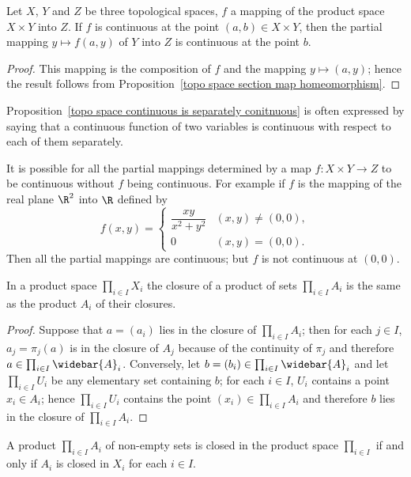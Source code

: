 \begin{proposition}\label{topo space continuous is separately conitnuous}
Let $X$, $Y$ and $Z$ be three topological spaces, $f$ a mapping of the product space $X\times Y$ into $Z$. If $f$ is continuous at the point $(a,b)\in X\times Y$, then the partial mapping $y\mapsto f(a,y)$ of $Y$ into $Z$ is continuous at the point $b$.
\end{proposition}
\begin{proof}
This mapping is the composition of $f$ and the mapping $y\mapsto(a,y)$; hence the result follows from Proposition~\ref{topo space section map homeomorphism}.
\end{proof}
Proposition~\ref{topo space continuous is separately conitnuous} is often expressed by saying that a continuous function of two variables is continuous with respect to each of them separately.
\begin{example}
It is possible for all the partial mappings determined by a map $f:X\times Y\to Z$ to be continuous without $f$ being continuous. For example if $f$ is the mapping of the real plane $\R^2$ into $\R$ defined by
\[f(x,y)=\begin{cases}
\dfrac{xy}{x^2+y^2}&(x,y)\neq(0,0),\\
0&(x,y)=(0,0).
\end{cases}\]
Then all the partial mappings are continuous; but $f$ is not continuous at $(0,0)$.
\end{example}
\begin{proposition}\label{topo space closure of product subspace}
In a product space $\prod_{i\in I}X_i$ the closure of a product of sets $\prod_{i\in I}A_i$ is the same as the product $A_i$ of their closures.
\end{proposition}
\begin{proof}
Suppose that $a=(a_i)$ lies in the closure of $\prod_{i\in I}A_i$; then for each $j\in I$, $a_j=\pi_j(a)$ is in the closure of $A_j$ because of the continuity of $\pi_j$ and therefore $a\in\prod_{i\in I}\widebar{A}_i$. Conversely, let $b=(b_i)\in\prod_{i\in I}\widebar{A}_i$ and let $\prod_{i\in I}U_i$ be any elementary set containing $b$; for each $i\in I$, $U_i$ contains a point $x_i\in A_i$; hence $\prod_{i\in I}U_i$ contains the point $(x_i)\in\prod_{i\in I}A_i$ and therefore $b$ lies in the closure of $\prod_{i\in I}A_i$.
\end{proof}
\begin{corollary}
A product $\prod_{i\in I}A_i$ of non-empty sets is closed in the product space $\prod_{i\in I}$ if and only if $A_i$ is closed in $X_i$ for each $i\in I$.
\end{corollary}
